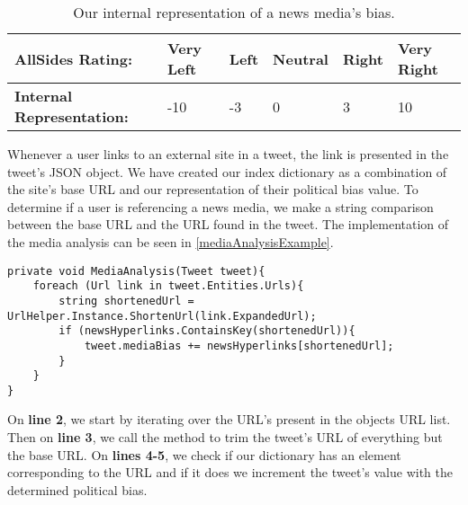 \begin{table}[H]
\begin{tabular}{|l|l|l|l|l|l|}
\hline
\textbf{AllSides Rating:} & Very Left & Left & Neutral & Right & Very Right \\\hline
\textbf{Internal Representation:} & -10 & -3 & 0 & 3 & 10 \\\hline
\end{tabular}
\caption{Our internal representation of a news media's bias.}
\label{AllsidesRepres}
\end{table}

Whenever a user links to an external site in a tweet, the link is presented
in the tweet's \ac{JSON} object. We have created our index dictionary as a
combination of the site's base URL and our representation of their political
bias value. To determine if a user is referencing a news media, we make a
string comparison between the base URL and the URL found in the tweet. The
implementation of the media analysis can be seen in
\autoref{mediaAnalysisExample}.\\


\begin{minipage}[H]{\linewidth}
\begin{lstlisting}[caption = Method for handling the media analysis., label =
mediaAnalysisExample] 
private void MediaAnalysis(Tweet tweet){
	foreach (Url link in tweet.Entities.Urls){
		string shortenedUrl = UrlHelper.Instance.ShortenUrl(link.ExpandedUrl);
        if (newsHyperlinks.ContainsKey(shortenedUrl)){
        	tweet.mediaBias += newsHyperlinks[shortenedUrl];
        }
	}
}
\end{lstlisting}
\end{minipage}

On \textbf{line 2}, we start by iterating over the URL's present in the
 objects URL list. Then on \textbf{line 3}, we call the
 method to trim the tweet's URL of everything but the
base URL. On \textbf{lines 4-5}, we check if our dictionary has an element
corresponding to the URL and if it does we increment the tweet's
 value with the determined political bias. 

% 
% 
% 

